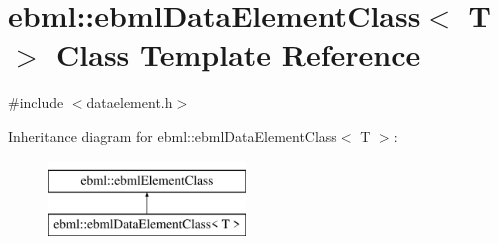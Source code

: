 \hypertarget{classebml_1_1ebmlDataElementClass}{}\section{ebml\+:\+:ebml\+Data\+Element\+Class$<$ T $>$ Class Template Reference}
\label{classebml_1_1ebmlDataElementClass}


{\ttfamily \#include $<$dataelement.\+h$>$}

Inheritance diagram for ebml\+:\+:ebml\+Data\+Element\+Class$<$ T $>$\+:\begin{figure}[H]
\begin{center}
\leavevmode
\includegraphics[height=2.000000cm]{classebml_1_1ebmlDataElementClass}
\end{center}
\end{figure}
